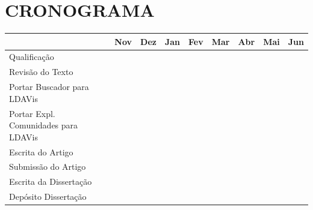 \documentclass[12pt,a4paper]{article}
\begin{document}
\section{CRONOGRAMA} \label{sec:cronograma}

\begin{center}
  \begin{tabular}{lllllllll}
                                         & Nov                    & Dez                      & Jan                    & Fev                    & Mar                     & Abr                    & Mai                     & Jun \\
  \hline                         
  Qualificação                           &\cellcolor[gray]{0.9}   &\cellcolor[gray]{0.9}     &                        &                        &                         &                        &                         &                        \\
  Revisão do Texto                       &                        &\cellcolor[gray]{0.9}     &                        &                        &                         &                        &                         &                        \\
  Portar Buscador para LDAVis            &\cellcolor[gray]{0.9}   &                          &                        &                        &                         &                        &                         &                        \\
  Portar Expl. Comunidades para LDAVis   &                        &\cellcolor[gray]{0.9}     &                        &                        &                         &                        &                         &                        \\
  Escrita do Artigo                      &                        &                          &\cellcolor[gray]{0.9}   &                        &                         &                        &                         &                        \\
  Submissão do Artigo                    &                        &                          &                        &\cellcolor[gray]{0.9}   &                         &                        &                         &                        \\
  Escrita da Dissertação                 &                        &                          &                        &                        &\cellcolor[gray]{0.9}    &\cellcolor[gray]{0.9}   &                         &                        \\
  Depósito Dissertação                   &                        &                          &                        &                        &                         &\cellcolor[gray]{0.9}   &                         &                        \\
  \hline
  \end{tabular}
\end{center}

\def\refname{REFERÊNCIAS BIBLIOGRÁFICAS}


\end{document}
